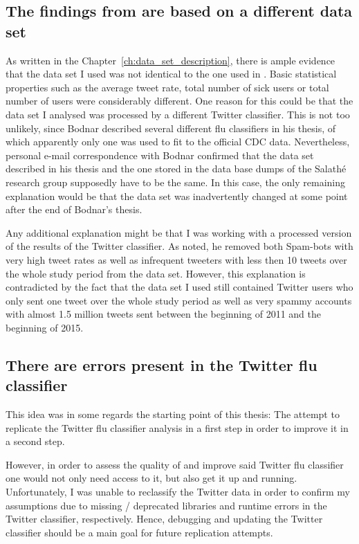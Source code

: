 \documentclass[11pt, a4paper,twoside]{report}\usepackage[]{graphicx}\usepackage[]{color}
\begin{document}
\subsection{The findings from \cite{bodnar_data_2015} are based on a different data set}
\label{sec:diff_data_set}
As written in the Chapter~\ref{ch:data_set_description}, there is ample evidence that the data set I used was not identical to the one used in \cite{bodnar_data_2015}. Basic statistical properties such as the average tweet rate, total number of sick users or total number of users were considerably different. One reason for this could be that the data set I analysed was processed by a different Twitter classifier. This is not too unlikely, since Bodnar described several different flu classifiers in his thesis, of which apparently only one was used to fit to the official CDC data. Nevertheless, personal e-mail correspondence with Bodnar confirmed that the data set described in his thesis and the one stored in the data base dumps of the Salathé research group supposedly have to be the same. In this case, the only remaining explanation would be that the data set was inadvertently changed at some point after the end of Bodnar's thesis.

Any additional explanation might be that I was working with a processed version of the results of the Twitter classifier. As \cite{bodnar_data_2015} noted, he removed both Spam-bots with very high tweet rates as well as infrequent tweeters with less then 10 tweets over the whole study period from the data set. However, this explanation is contradicted by the fact that the data set I used still contained Twitter users who only sent one tweet over the whole study period as well as very spammy accounts with almost 1.5 million tweets sent between the beginning of 2011 and the beginning of 2015.

\subsection{There are errors present in the Twitter flu classifier}
This idea was in some regards the starting point of this thesis: The attempt to replicate the Twitter flu classifier analysis in a first step in order to improve it in a second step.

However, in order to assess the quality of and improve said Twitter flu classifier one would not only need access to it, but also get it up and running. Unfortunately, I was unable to reclassify the Twitter data in order to confirm my assumptions due to missing / deprecated libraries and runtime errors in the Twitter classifier, respectively. Hence, debugging and updating the Twitter classifier should be a main goal for future replication attempts.
\end{document}

